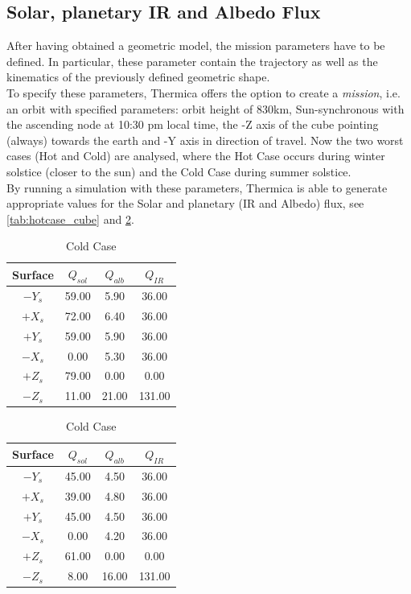 \subsection{Solar, planetary IR and Albedo Flux}
After having obtained a geometric model, the mission parameters have to be defined. In particular, these parameter contain the trajectory as well as the kinematics of the previously defined geometric shape.\\
To specify these parameters, Thermica offers the option to create a \textit{mission}, i.e. an orbit with specified parameters: orbit height of 830km, Sun-synchronous with the ascending node at 10:30 pm local time, the -Z axis of the cube pointing (always) towards the earth and -Y axis in direction of travel. Now the two worst cases (Hot and Cold) are analysed, where the Hot Case occurs during winter solstice (closer to the sun) and the Cold Case during summer solstice.\\
By running a simulation with these parameters, Thermica is able to generate appropriate values for the Solar and planetary (IR and Albedo) flux, see \cref{tab:hotcase_cube} and \cref{tab:coldcase_cube}.



\begin{table}[!htb]
    \caption*{Solar and Planetary Flux Values}
    \begin{minipage}{.5\linewidth}
    \centering
      \caption{Hot Case}
      \label{tab:hotcase_cube}
		\begin{tabular}{|c | c | c | c|}
			\hline
			Surface & $Q_{sol}$ & $Q_{alb}$ & $Q_{IR}$ \\
			\hline
			$-Y_s$ & 59.00 & 5.90 & 36.00\\ \hline
			$+X_s$ & 72.00 & 6.40 & 36.00\\ \hline
			$+Y_s$ & 59.00 & 5.90 & 36.00\\ \hline
			$-X_s$ & 0.00 & 5.30 & 36.00\\ \hline
			$+Z_s$ & 79.00 & 0.00 & 0.00\\ \hline
			$-Z_s$ & 11.00 & 21.00 & 131.00\\ \hline
		\end{tabular}
    \end{minipage}%
    \begin{minipage}{.5\linewidth}
      \centering
        \caption{Cold Case}
        \label{tab:coldcase_cube}
		\begin{tabular}{|c | c | c | c|}
			\hline
			Surface & $Q_{sol}$ & $Q_{alb}$ & $Q_{IR}$ \\
			\hline
			$-Y_s$ & 45.00 & 4.50 & 36.00\\ \hline
			$+X_s$ & 39.00 & 4.80 & 36.00\\ \hline
			$+Y_s$ & 45.00 & 4.50 & 36.00\\ \hline
			$-X_s$ & 0.00 & 4.20 & 36.00\\ \hline
			$+Z_s$ & 61.00 & 0.00 & 0.00\\ \hline
			$-Z_s$ & 8.00 & 16.00 & 131.00\\ \hline
		\end{tabular}
    \end{minipage} 
\end{table}

